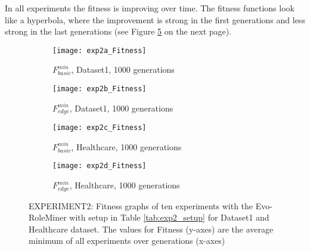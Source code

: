 In all experiments the fitness is improving over time. The fitness functions look like a hyperbola, where the improvement is strong in the first generations and less strong in the last generations (see Figure \ref{fig:Results_Exp2_FitnessGraphs} on the next page). 

\begin{figure}[H]
	\centering
	\begin{subfigure}{0.5\textwidth}
		\texttt{[image: exp2a\_Fitness]}
		\caption{$F_{basic}^{min}$, Dataset1, 1000 generations}
		\label{fig:exp2a_Fitness}
	\end{subfigure}%
	\begin{subfigure}{0.5\textwidth}
		\centering
		\texttt{[image: exp2b\_Fitness]}
		\caption{$F_{edge}^{min}$, Dataset1, 1000 generations}
		\label{fig:exp2b_Fitness}
	\end{subfigure}
	
	\begin{subfigure}{0.5\textwidth}
		\texttt{[image: exp2c\_Fitness]}
		\caption{$F_{basic}^{min}$, Healthcare, 1000 generations}
		\label{fig:exp2c_Fitness}
	\end{subfigure}%
	\begin{subfigure}{0.5\textwidth}
		\centering
		\texttt{[image: exp2d\_Fitness]}
		\caption{$F_{edge}^{min}$, Healthcare, 1000 generations}
		\label{fig:exp2d_Fitness}
	\end{subfigure}
	\caption{EXPERIMENT2: Fitness graphs of ten experiments with the Evo-RoleMiner with setup in Table \ref{tab:exp2_setup} for Dataset1 and Healthcare dataset. The values for Fitness (y-axes) are the average minimum of all experiments over generations (x-axes)}
	\label{fig:Results_Exp2_FitnessGraphs}
\end{figure}

